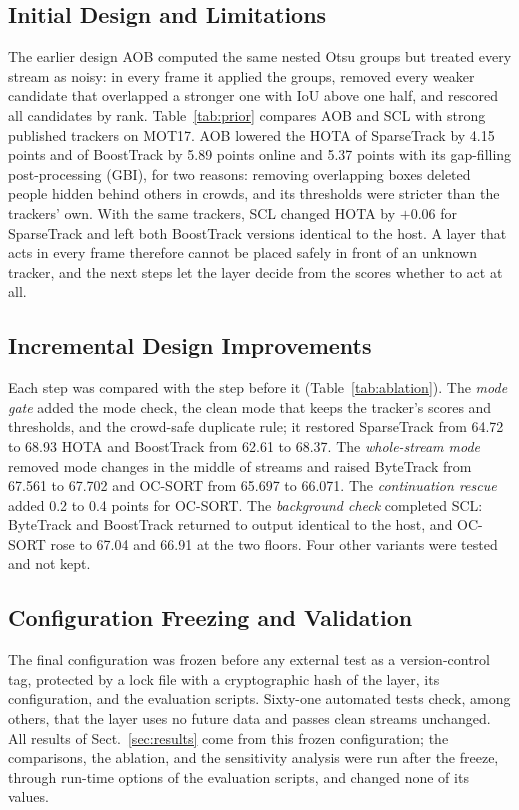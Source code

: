 \documentclass[pdflatex,sn-mathphys-num,iicol]{sn-jnl}
\newcommand{\scl}{SCL}
\newcommand{\aob}{AOB}
\begin{document}
\subsection{Initial Design and Limitations}\label{sec:prior}
The earlier design \aob{} computed the same nested Otsu groups but treated every stream as noisy:
in every frame it applied the groups, removed every weaker candidate that overlapped a stronger one
with IoU above one half, and rescored all candidates by rank. Table~\ref{tab:prior} compares \aob{}
and \scl{} with strong published trackers on MOT17. \aob{} lowered the HOTA of SparseTrack by 4.15
points and of BoostTrack by 5.89 points online and 5.37 points with its gap-filling post-processing
(GBI), for two reasons: removing overlapping boxes deleted people hidden behind others in crowds,
and its thresholds were stricter than the trackers' own. With the same trackers, \scl{} changed
HOTA by $+0.06$ for SparseTrack and left both BoostTrack versions identical to the host. A layer
that acts in every frame therefore cannot be placed safely in front of an unknown tracker, and the
next steps let the layer decide from the scores whether to act at all.


\subsection{Incremental Design Improvements}\label{sec:steps}
Each step was compared with the step before it (Table~\ref{tab:ablation}). The \emph{mode gate}
added the mode check, the clean mode that keeps the tracker's scores and thresholds, and the crowd-safe duplicate
rule; it restored SparseTrack from 64.72 to 68.93 HOTA and BoostTrack from 62.61 to 68.37. The
\emph{whole-stream mode} removed mode changes in the middle of streams and raised ByteTrack from
67.561 to 67.702 and OC-SORT from 65.697 to 66.071. The \emph{continuation rescue} added 0.2 to 0.4
points for OC-SORT. The \emph{background check} completed \scl{}: ByteTrack and BoostTrack returned
to output identical to the host, and OC-SORT rose to 67.04 and 66.91 at the two floors. Four other
variants were tested and not kept.


\subsection{Configuration Freezing and Validation}\label{sec:freeze}
The final configuration was frozen before any external test as a version-control tag, protected
by a lock file with a cryptographic hash of the layer, its configuration, and the evaluation
scripts. Sixty-one automated tests check, among others, that the layer uses no future data and
passes clean streams unchanged. All results of Sect.~\ref{sec:results} come from this frozen
configuration; the comparisons, the ablation, and the sensitivity analysis were run after the
freeze, through run-time options of the evaluation scripts, and changed none of its values.
\end{document}

